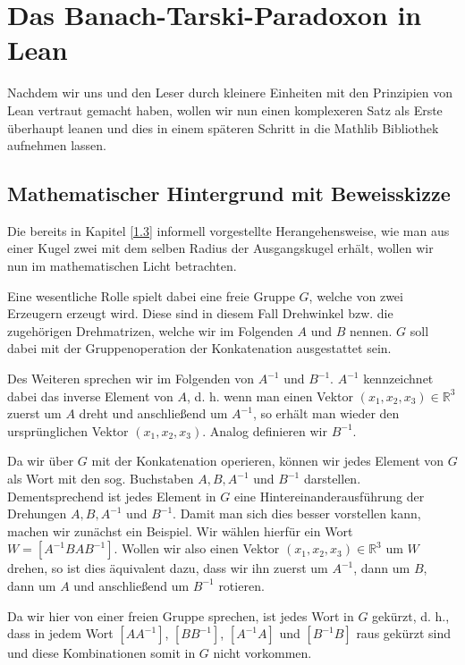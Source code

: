 \documentclass[10pt]{article}
\begin{document}
\section{Das Banach-Tarski-Paradoxon in Lean}
Nachdem wir uns und den Leser durch kleinere Einheiten mit den Prinzipien von Lean vertraut gemacht haben, wollen wir nun einen komplexeren Satz als Erste überhaupt leanen und dies in einem späteren Schritt in die Mathlib Bibliothek aufnehmen lassen.

\subsection{Mathematischer Hintergrund mit Beweisskizze}

\noindent Die bereits in Kapitel \ref{1.3} informell vorgestellte Herangehensweise, wie man aus einer Kugel zwei mit dem selben Radius der Ausgangskugel erhält, wollen wir nun im mathematischen Licht betrachten.

\noindent Eine wesentliche Rolle spielt dabei eine freie Gruppe $G$, welche von zwei Erzeugern erzeugt wird. Diese sind in diesem Fall Drehwinkel bzw. die zugehörigen Drehmatrizen, welche wir im Folgenden $A$ und $B$ nennen. $G$ soll dabei mit der Gruppenoperation der Konkatenation ausgestattet sein.\par

\noindent Des Weiteren sprechen wir im Folgenden von $A^{-1}$ und $B^{-1}$. $A^{-1}$ kennzeichnet dabei das inverse Element von $A$, d. h. wenn man einen Vektor $(x_1,x_2,x_3)\in\mathbb{R}^3$ zuerst um $A$ dreht und anschließend um $A^{-1}$, so erhält man wieder den ursprünglichen Vektor $(x_1,x_2,x_3)$. Analog definieren wir $B^{-1}$.

\noindent Da wir über $G$ mit der Konkatenation operieren, können wir jedes Element von $G$ als Wort mit den sog. Buchstaben $A, B, A^{-1}$ und $B^{-1}$ darstellen. Dementsprechend ist jedes Element in $G$ eine Hintereinanderausführung der Drehungen $A, B, A^{-1}$ und $B^{-1}$. Damit man sich dies besser vorstellen kann, machen wir zunächst ein Beispiel. Wir wählen hierfür ein Wort $W=[ A^{-1}BAB^{-1} ]$. Wollen wir also einen Vektor $(x_1,x_2,x_3)\in\mathbb{R}^3$ um $W$ drehen, so ist dies äquivalent dazu, dass wir ihn zuerst um $A^{-1}$, dann um $B$, dann um $A$ und anschließend um $B^{-1}$ rotieren.

\noindent Da wir hier von einer freien Gruppe sprechen, ist jedes Wort in $G$ gekürzt, d. h., dass in jedem Wort $[ AA^{-1} ]$, $[ BB^{-1} ]$, $[ A^{-1}A ]$ und $[ B^{-1}B ]$ raus gekürzt sind und diese Kombinationen somit in $G$ nicht vorkommen.\par
\end{document}
